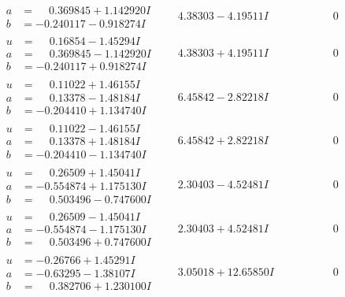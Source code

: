 \documentclass[1p]{elsarticle_modified}
\theoremstyle{definition}
\begin{document}
$$\begin{array}{c|c|c}
\begin{aligned}
a &= \phantom{-}0.369845 + 1.142920 I \\
b &= -0.240117 - 0.918274 I\end{aligned}
 & \phantom{-}4.38303 - 4.19511 I & \phantom{-0.000000 } 0 \\ \hline\begin{aligned}
u &= \phantom{-}0.16854 - 1.45294 I \\
a &= \phantom{-}0.369845 - 1.142920 I \\
b &= -0.240117 + 0.918274 I\end{aligned}
 & \phantom{-}4.38303 + 4.19511 I & \phantom{-0.000000 } 0 \\ \hline\begin{aligned}
u &= \phantom{-}0.11022 + 1.46155 I \\
a &= \phantom{-}0.13378 - 1.48184 I \\
b &= -0.204410 + 1.134740 I\end{aligned}
 & \phantom{-}6.45842 - 2.82218 I & \phantom{-0.000000 } 0 \\ \hline\begin{aligned}
u &= \phantom{-}0.11022 - 1.46155 I \\
a &= \phantom{-}0.13378 + 1.48184 I \\
b &= -0.204410 - 1.134740 I\end{aligned}
 & \phantom{-}6.45842 + 2.82218 I & \phantom{-0.000000 } 0 \\ \hline\begin{aligned}
u &= \phantom{-}0.26509 + 1.45041 I \\
a &= -0.554874 + 1.175130 I \\
b &= \phantom{-}0.503496 - 0.747600 I\end{aligned}
 & \phantom{-}2.30403 - 4.52481 I & \phantom{-0.000000 } 0 \\ \hline\begin{aligned}
u &= \phantom{-}0.26509 - 1.45041 I \\
a &= -0.554874 - 1.175130 I \\
b &= \phantom{-}0.503496 + 0.747600 I\end{aligned}
 & \phantom{-}2.30403 + 4.52481 I & \phantom{-0.000000 } 0 \\ \hline\begin{aligned}
u &= -0.26766 + 1.45291 I \\
a &= -0.63295 - 1.38107 I \\
b &= \phantom{-}0.382706 + 1.230100 I\end{aligned}
 & \phantom{-}3.05018 + 12.65850 I & \phantom{-0.000000 } 0 \\ \hline\begin{aligned}

\end{aligned}
\end{array}$$
\end{document}
